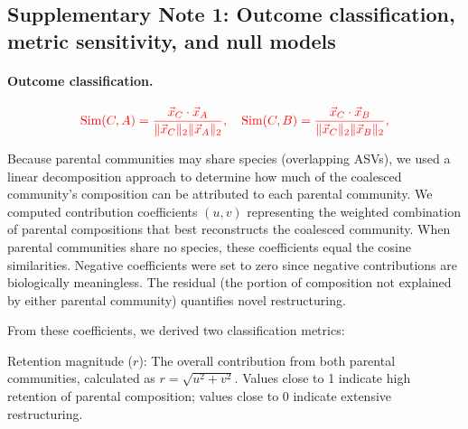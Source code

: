 
\subsection*{Supplementary Note 1: Outcome classification, metric sensitivity, and null models}
\label{sec:suppl:note1}

\paragraph{Outcome classification.}
\begin{equation}
\textcolor{red}{\text{Sim}(C, A) = \frac{\vec{x}_C \cdot \vec{x}_A}{\|\vec{x}_C\|_2 \|\vec{x}_A\|_2}, \quad
\text{Sim}(C, B) = \frac{\vec{x}_C \cdot \vec{x}_B}{\|\vec{x}_C\|_2 \|\vec{x}_B\|_2},}
\end{equation}

Because parental communities may share species (overlapping ASVs), we used a linear decomposition approach to determine how much of the coalesced community's composition can be attributed to each parental community. We computed contribution coefficients $(u, v)$ representing the weighted combination of parental compositions that best reconstructs the coalesced community. When parental communities share no species, these coefficients equal the cosine similarities. Negative coefficients were set to zero since negative contributions are biologically meaningless. The residual (the portion of composition not explained by either parental community) quantifies novel restructuring.

From these coefficients, we derived two classification metrics:

Retention magnitude ($r$): The overall contribution from both parental communities, calculated as $r = \sqrt{u^2 + v^2}$. Values close to 1 indicate high retention of parental composition; values close to 0 indicate extensive restructuring.

